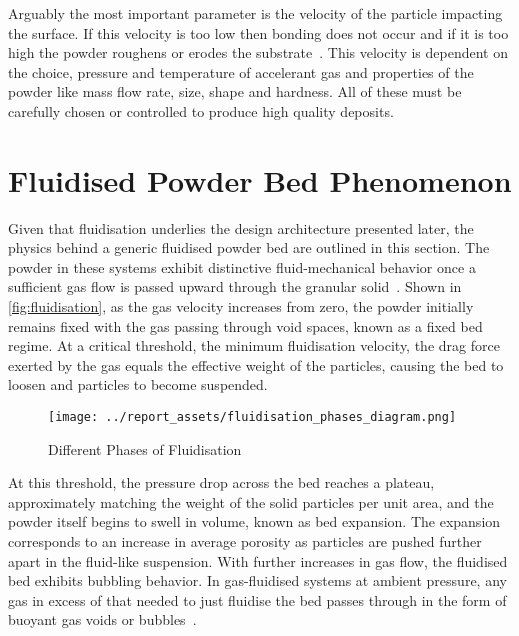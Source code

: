 Arguably the most important parameter is the velocity of the particle impacting the surface. If this velocity is too low then bonding does not occur and if it is too high the powder roughens or erodes the substrate~\cite{Guo2022}. This velocity is dependent on the choice, pressure and temperature of accelerant gas and properties of the powder like mass flow rate, size, shape and hardness. All of these must be carefully chosen or controlled to produce high quality deposits.

\newpage

\section{Fluidised Powder Bed Phenomenon}
Given that fluidisation underlies the design architecture presented later, the physics behind a generic fluidised powder bed are outlined in this section. The powder in these systems exhibit distinctive fluid-mechanical behavior once a sufficient gas flow is passed upward through the granular solid~\cite{KuniiLevenspiel1977}. Shown in \autoref{fig:fluidisation}, as the gas velocity increases from zero, the powder initially remains fixed with the gas passing through void spaces, known as a fixed bed regime. At a critical threshold, the minimum fluidisation velocity, the drag force exerted by the gas equals the effective weight of the particles, causing the bed to loosen and particles to become suspended.
\begin{figure}[htbp]
    \centering
    
    \begin{minipage}{0.63\textwidth}
        \centering
        \texttt{[image: ../report\_assets/fluidisation\_phases\_diagram.png]}
        \caption{Different Phases of Fluidisation~\cite{klaren2021fluidization}}
    \end{minipage}
    
\end{figure}\label{fig:fluidisation}
At this threshold, the pressure drop across the bed reaches a plateau, approximately matching the weight of the solid particles per unit area, and the powder itself begins to swell in volume, known as bed expansion. The expansion corresponds to an increase in average porosity as particles are pushed further apart in the fluid-like suspension. With further increases in gas flow, the fluidised bed exhibits bubbling behavior. In gas-fluidised systems at ambient pressure, any gas in excess of that needed to just fluidise the bed passes through in the form of buoyant gas voids or bubbles~\cite{SHENG2022137168}.

